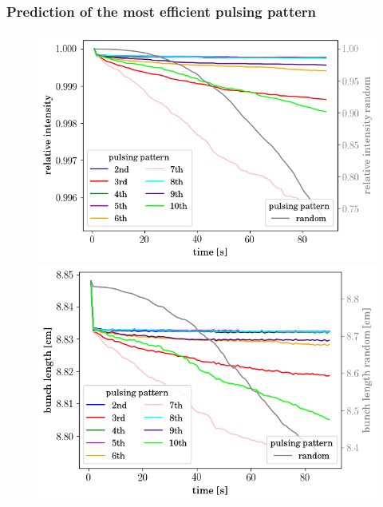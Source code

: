 \documentclass[%
 reprint,
 amsmath,amssymb,
 aps,
prstab,
]{revtex4-1}
\begin{document}
\subsubsection{Prediction of the most efficient pulsing pattern\label{sec:pattern}}
\begin{figure}[b]
	\begin{minipage}[t]{0.49\linewidth}
		\centering
		\includegraphics[width=1.0\linewidth]{2016injerra2b2u_pattern_3_5um_intensity.png}
	\end{minipage}
	\begin{minipage}[t]{0.49\linewidth}
		\centering
		\includegraphics[width=1.0\linewidth]{2016injerra2b2u_pattern_3_5um_sigm.png}
	\end{minipage}	
	\begin{minipage}[t]{0.49\linewidth}
		\centering

\end{minipage}
\end{figure}
\end{document}
